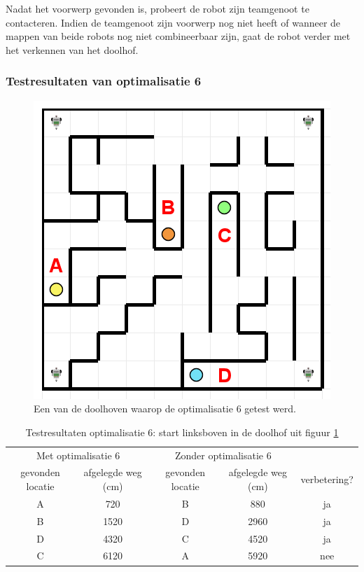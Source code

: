 \documentclass[tt3]{penoverslag}
\begin{document}
Nadat het voorwerp gevonden is, probeert de robot zijn teamgenoot te contacteren. Indien de teamgenoot zijn voorwerp nog niet heeft of wanneer de mappen van beide robots nog niet combineerbaar zijn, gaat de robot verder met het verkennen van het doolhof. \\

\subsubsection{Testresultaten van optimalisatie 6}
\label{ssec:AlgoZoekTest}

\begin{figure}[!hb]
\centering
	\includegraphics[scale=0.5]{doolhof3}
	\caption{Een van de doolhoven waarop de optimalisatie 6 getest werd.}
\label{fig:TestDead}
\end{figure}

\begin{table}[h]
\begin{center}
    \begin{tabular}{ c | c | c | c | c}
   \multicolumn{2}{c|}{Met optimalisatie 6} & \multicolumn{2}{|c|}{Zonder optimalisatie 6} & \\
     gevonden locatie & afgelegde weg (cm) & gevonden locatie &  afgelegde weg (cm) & verbetering?\\ \hline\hline
    A & 720 & B & 880 & ja \\ \hline
    B & 1520 & D & 2960 & ja \\ \hline
    D & 4320 & C & 4520 & ja\\ \hline
    C & 6120 & A & 5920 & nee\\
    \end{tabular}
    \caption{Testresultaten optimalisatie 6: start linksboven in de doolhof uit figuur \ref{fig:TestDead}}
    \label{tab:resultVerken1}
\end{center}
\end{table}
\end{document}

